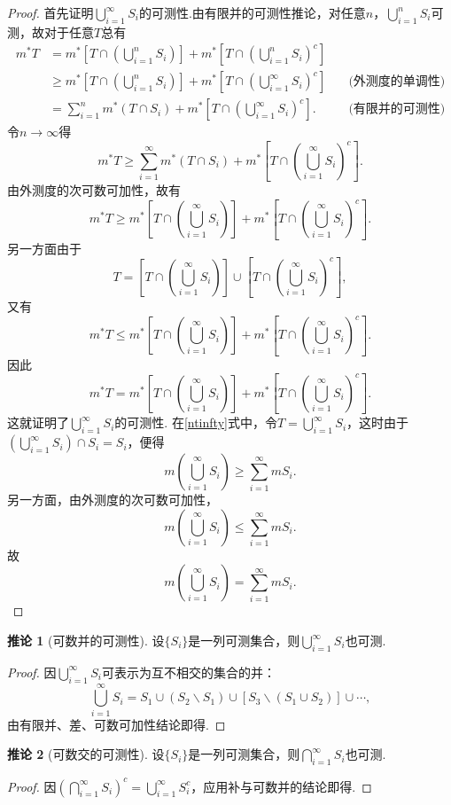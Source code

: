 \documentclass[lang=cn,12pt]{ctexart}
\theoremstyle{definition}
\newtheorem{corollary}{推论}
\theoremstyle{plain}
\begin{document}
\begin{proof}
	首先证明$\bigcup\limits_{i=1}^{\infty}S_i$的可测性.由有限并的可测性推论，对任意$n$，$\bigcup\limits_{i=1}^{n}S_i$可测，故对于任意$T$总有
	\begin{align*}
		m^*T
		&=m^*\left[T\cap\left(\bigcup_{i=1}^{n}S_i\right)\right]+m^*\left[T\cap\left(\bigcup_{i=1}^{n}S_i\right)^c\right]\\
		&\geqslant m^*\left[T\cap\left(\bigcup_{i=1}^{n}S_i\right)\right]+m^*\left[T\cap\left(\bigcup_{i=1}^{\infty}S_i\right)^c\right]\quad&\text{(外测度的单调性)}\\
		&=\sum_{i=1}^{n}m^*(T\cap S_i)+m^*\left[T\cap\left(\bigcup_{i=1}^{\infty}S_i\right)^c\right].\quad&\text{(有限并的可测性)}
	\end{align*}
	令$n\to\infty$得
	\begin{equation}\label{ntinfty}
		m^*T\geqslant\sum_{i=1}^{\infty}m^*(T\cap S_i)+m^*\left[T\cap\left(\bigcup_{i=1}^{\infty}S_i\right)^c\right].
	\end{equation}
	由外测度的次可数可加性，故有
	$$m^*T\geqslant m^*\left[T\cap\left(\bigcup_{i=1}^{\infty}S_i\right)\right]+m^*\left[T\cap\left(\bigcup_{i=1}^{\infty}S_i\right)^c\right].$$
	另一方面由于
	$$T=\left[T\cap\left(\bigcup_{i=1}^{\infty}S_i\right)\right]\cup\left[T\cap\left(\bigcup_{i=1}^{\infty}S_i\right)^c\right],$$
	又有
	$$m^*T\leqslant m^*\left[T\cap\left(\bigcup_{i=1}^{\infty}S_i\right)\right]+m^*\left[T\cap\left(\bigcup_{i=1}^{\infty}S_i\right)^c\right].$$
	因此
	$$m^*T= m^*\left[T\cap\left(\bigcup_{i=1}^{\infty}S_i\right)\right]+m^*\left[T\cap\left(\bigcup_{i=1}^{\infty}S_i\right)^c\right].$$
	这就证明了$\bigcup\limits_{i=1}^{\infty}S_i$的可测性.
	在\ref{ntinfty}式中，令$T=\bigcup\limits_{i=1}^{\infty}S_i$，这时由于$\left(\bigcup\limits_{i=1}^{\infty}S_i\right)\cap S_i=S_i$，便得
	$$m\left(\bigcup_{i=1}^{\infty}S_i\right)\geqslant\sum_{i=1}^{\infty}mS_i.$$
	另一方面，由外测度的次可数可加性，
	$$m\left(\bigcup_{i=1}^{\infty}S_i\right)\leqslant\sum_{i=1}^{\infty}mS_i.$$
	故
	$$m\left(\bigcup_{i=1}^{\infty}S_i\right)=\sum_{i=1}^{\infty}mS_i.$$
	
\end{proof}
\begin{corollary}[可数并的可测性]
	设$\{S_i\}$是一列可测集合，则$\bigcup\limits_{i=1}^{\infty}S_i$也可测.
\end{corollary}
\begin{proof}
	因$\bigcup\limits_{i=1}^{\infty}S_i$可表示为互不相交的集合的并：
	$$\bigcup\limits_{i=1}^{\infty}S_i=S_1\cup(S_2\backslash S_1)\cup\left[S_3\backslash(S_1\cup S_2)\right]\cup\cdots,$$
	由有限并、差、可数可加性结论即得.
\end{proof}
\begin{corollary}[可数交的可测性]
	设$\{S_i\}$是一列可测集合，则$\bigcap\limits_{i=1}^{\infty}S_i$也可测.
\end{corollary}
\begin{proof}
	因$\left(\bigcap\limits_{i=1}^{\infty}S_i\right)^c=\bigcup\limits_{i=1}^{\infty}S_i^c$，应用补与可数并的结论即得.
\end{proof}
\end{document}
